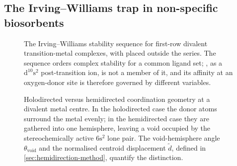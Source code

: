 \subsection{The Irving--Williams trap in non-specific biosorbents}
\label{sec:irving-williams}
%


\begin{figure}[htbp]
  \centering
  \caption[The Irving--Williams series with \PbII{} placed outside it]{The Irving--Williams stability sequence for first-row divalent transition-metal complexes, with \PbII{} placed outside the series. The sequence orders complex stability for a common ligand set; \PbII{}, as a $\mathrm{d}^{10}\mathrm{s}^2$ post-transition ion, is not a member of it, and its affinity at an oxygen-donor site is therefore governed by different variables.}
  \label{fig:irving-williams}
\end{figure}

\begin{figure}[htbp]
  \centering
  \caption[Holodirected versus hemidirected coordination geometry]{Holodirected versus hemidirected coordination geometry at a divalent metal centre. In the holodirected case the donor atoms surround the metal evenly; in the hemidirected case they are gathered into one hemisphere, leaving a void occupied by the stereochemically active $6\mathrm{s}^2$ lone pair. The void-hemisphere angle $\theta_{\mathrm{void}}$ and the normalised centroid displacement $\tilde{d}$, defined in \cref{sec:hemidirection-method}, quantify the distinction.}
  \label{fig:holo-hemi}
\end{figure}

